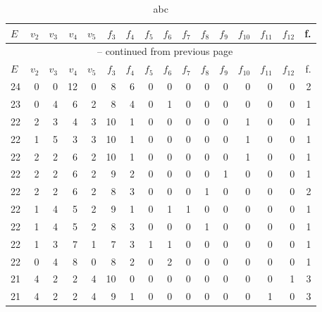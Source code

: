 \begin{appendix}
\footnotesize{\begin{longtable}{lrrrrrrrrrrrrrrr}
    \caption{abc}
    \label{abc}\\
\toprule    
    $E$ & $v_2$ & $v_3$ & $v_4$ & $v_5$ & $f_3$ & $f_4$ & $f_5$ & $f_6$ & $f_7$ & $f_8$ & $f_9$ & $f_{10}$ & $f_{11}$ & $f_{12}$ & f. \\\midrule
\endfirsthead

\multicolumn{16}{c}{\tablename~\thetable{} -- continued from previous page}\\
\toprule
    $E$ & $v_2$ & $v_3$ & $v_4$ & $v_5$ & $f_3$ & $f_4$ & $f_5$ & $f_6$ & $f_7$ & $f_8$ & $f_9$ & $f_{10}$ & $f_{11}$ & $f_{12}$ & f. \\\midrule
\endhead

\bottomrule\endfoot

    24        & 0  & 0  & 12 & 0  & 8  & 6  & 0  & 0  & 0  & 0  & 0  & 0   & 0   & 0   & 2    \\\midrule
    23        & 0  & 4  & 6  & 2  & 8  & 4  & 0  & 1  & 0  & 0  & 0  & 0   & 0   & 0   & 1    \\\midrule
    22        & 2  & 3  & 4  & 3  & 10 & 1  & 0  & 0  & 0  & 0  & 0  & 1   & 0   & 0   & 1    \\
    22        & 1  & 5  & 3  & 3  & 10 & 1  & 0  & 0  & 0  & 0  & 0  & 1   & 0   & 0   & 1    \\
    22        & 2  & 2  & 6  & 2  & 10 & 1  & 0  & 0  & 0  & 0  & 0  & 1   & 0   & 0   & 1    \\
    22        & 2  & 2  & 6  & 2  & 9  & 2  & 0  & 0  & 0  & 0  & 1  & 0   & 0   & 0   & 1    \\
    22        & 2  & 2  & 6  & 2  & 8  & 3  & 0  & 0  & 0  & 1  & 0  & 0   & 0   & 0   & 2    \\
    22        & 1  & 4  & 5  & 2  & 9  & 1  & 0  & 1  & 1  & 0  & 0  & 0   & 0   & 0   & 1    \\
    22        & 1  & 4  & 5  & 2  & 8  & 3  & 0  & 0  & 0  & 1  & 0  & 0   & 0   & 0   & 1    \\
    22        & 1  & 3  & 7  & 1  & 7  & 3  & 1  & 1  & 0  & 0  & 0  & 0   & 0   & 0   & 1    \\
    22        & 0  & 4  & 8  & 0  & 8  & 2  & 0  & 2  & 0  & 0  & 0  & 0   & 0   & 0   & 1    \\\midrule
    21        & 4  & 2  & 2  & 4  & 10 & 0  & 0  & 0  & 0  & 0  & 0  & 0   & 0   & 1   & 3    \\
    21        & 4  & 2  & 2  & 4  & 9  & 1  & 0  & 0  & 0  & 0  & 0  & 0   & 1   & 0   & 3    \\

\end{longtable}}
\end{appendix}
